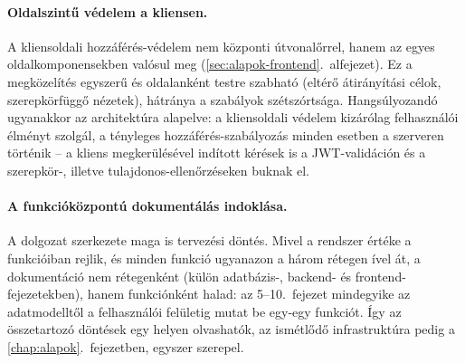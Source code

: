 \paragraph{Oldalszintű védelem a kliensen.} A kliensoldali hozzáférés-védelem nem központi
útvonalőrrel, hanem az egyes oldalkomponensekben valósul meg
(\ref{sec:alapok-frontend}.~alfejezet). Ez a megközelítés egyszerű és oldalanként testre
szabható (eltérő átirányítási célok, szerepkörfüggő nézetek), hátránya a szabályok szétszórtsága.
Hangsúlyozandó ugyanakkor az architektúra alapelve: a kliensoldali védelem kizárólag felhasználói
élményt szolgál, a tényleges hozzáférés-szabályozás minden esetben a szerveren történik -- a
kliens megkerülésével indított kérések is a JWT-validáción és a szerepkör-, illetve
tulajdonos-ellenőrzéseken buknak el.

\paragraph{A funkcióközpontú dokumentálás indoklása.} A dolgozat szerkezete maga is tervezési
döntés. Mivel a rendszer értéke a funkcióiban rejlik, és minden funkció ugyanazon a három
rétegen ível át, a dokumentáció nem rétegenként (külön adatbázis-, backend- és
frontend-fejezetekben), hanem funkciónként halad: az 5--10.~fejezet mindegyike az adatmodelltől
a felhasználói felületig mutat be egy-egy funkciót. Így az összetartozó döntések egy helyen
olvashatók, az ismétlődő infrastruktúra pedig a \ref{chap:alapok}.~fejezetben, egyszer szerepel.
